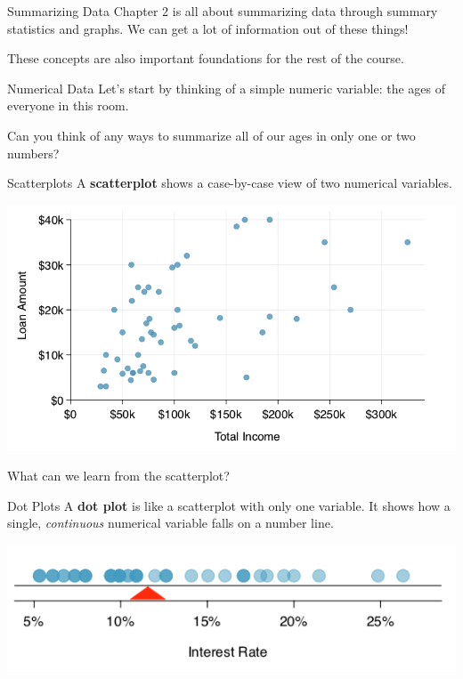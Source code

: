 \begin{frame}{Summarizing Data}
    Chapter 2 is all about summarizing data through summary statistics and graphs. We can get a lot of information out of these things!
    
    \vspace{12pt}
    These concepts are also important foundations for the rest of the course.
\end{frame}

\begin{frame}{Numerical Data}
    Let's start by thinking of a simple numeric variable: the ages of everyone in this room.
    
    \vspace{18pt}
    Can you think of any ways to summarize all of our ages in only one or two numbers?
\end{frame}

\begin{frame}{Scatterplots}
    A \textbf{scatterplot} shows a case-by-case view of two numerical variables. 
    
    \begin{center}\includegraphics[scale=0.3]{images/scatter2.png}\end{center}
    
    What can we learn from the scatterplot?
\end{frame}

\begin{frame}{Dot Plots}
    A \textbf{dot plot} is like a scatterplot with only one variable. It shows how a single, \textit{continuous} numerical variable falls on a number line. 
    
    \begin{center}\includegraphics[scale=0.5]{images/dotplot.png}\end{center}
    
\end{frame}

